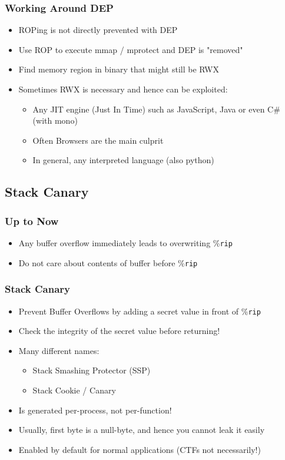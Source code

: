 \documentclass[aspectratio=169]{beamer}
\newcommand{\reg}[1]{\%\texttt{#1}}
\begin{document}
{\begin{frame}
    \frametitle{Working Around DEP}
    \begin{itemize}
        \item ROPing is not directly prevented with DEP
        \item Use ROP to execute mmap / mprotect and DEP is "removed"
        \item Find memory region in binary that might still be RWX
        \item Sometimes RWX is necessary and hence can be exploited:
        \begin{itemize}
            \item Any JIT engine (Just In Time) such as JavaScript, Java or even C\# (with mono)
            \item Often Browsers are the main culprit
            \item In general, any interpreted language (also python)
        \end{itemize}
    \end{itemize}

\end{frame}

\subsection{Stack Canary}

\begin{frame}
    \frametitle{Up to Now}
    \begin{itemize}
        \item Any buffer overflow immediately leads to overwriting \reg{rip}
        \item Do not care about contents of buffer before \reg{rip}
    \end{itemize}

\end{frame}

\begin{frame}
    \frametitle{Stack Canary}
    \begin{itemize}
        \item Prevent Buffer Overflows by adding a secret value in front of \reg{rip}
        \item Check the integrity of the secret value before returning!
        \item Many different names:
        \begin{itemize}
            \item Stack Smashing Protector (SSP)
            \item Stack Cookie / Canary
        \end{itemize}
        \item Is generated per-process, not per-function!
        \item Usually, first byte is a null-byte, and hence you cannot leak it easily
        \item Enabled by default for normal applications (CTFs not necessarily!)
    \end{itemize}
\end{frame}

}
\end{document}
